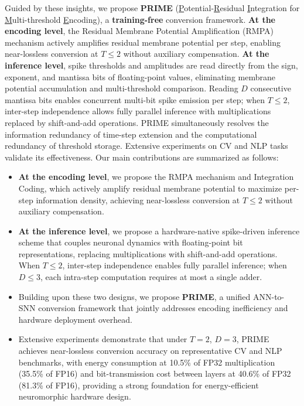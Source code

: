 Guided by these insights, we propose \textbf{PRIME} (\underline{P}otential-\underline{R}esidual \underline{I}ntegration for \underline{M}ulti-threshold \underline{E}ncoding), a \textbf{training-free} conversion framework.
\textbf{At the encoding level}, the Residual Membrane Potential Amplification (RMPA) mechanism actively amplifies residual membrane potential per step, enabling near-lossless conversion at $T \leq 2$ without auxiliary compensation. \textbf{At the inference level}, spike thresholds and amplitudes are read directly from the sign, exponent, and mantissa bits of floating-point values, eliminating membrane potential accumulation and multi-threshold comparison. Reading $D$ consecutive mantissa bits enables concurrent multi-bit spike emission per step; when $T \leq 2$, inter-step independence allows fully parallel inference with multiplications replaced by shift-and-add operations. PRIME simultaneously resolves the information redundancy of time-step extension and the computational redundancy of threshold storage. Extensive experiments on CV and NLP tasks validate its effectiveness. Our main contributions are summarized as follows:
\begin{itemize}
\item \textbf{At the encoding level}, we propose the RMPA mechanism and Integration Coding, which actively amplify residual membrane potential to maximize per-step information density, achieving near-lossless conversion at $T \leq 2$ without auxiliary compensation.
\item \textbf{At the inference level}, we propose a hardware-native spike-driven inference scheme that couples neuronal dynamics with floating-point bit representations, replacing multiplications with shift-and-add operations. When $T \leq 2$, inter-step independence enables fully parallel inference; when $D \leq 3$, each intra-step computation requires at most a single adder.
\item Building upon these two designs, we propose \textbf{PRIME}, a unified  ANN-to-SNN conversion framework that jointly addresses encoding inefficiency and hardware deployment overhead.

\item Extensive experiments demonstrate that under $T=2$, $D=3$, PRIME achieves near-lossless conversion accuracy on representative CV and NLP benchmarks, with energy consumption at 10.5\% of FP32 multiplication (35.5\% of FP16) and bit-transmission cost between layers at 40.6\% of FP32 (81.3\% of FP16), providing a strong foundation for energy-efficient neuromorphic hardware design.
\end{itemize}

